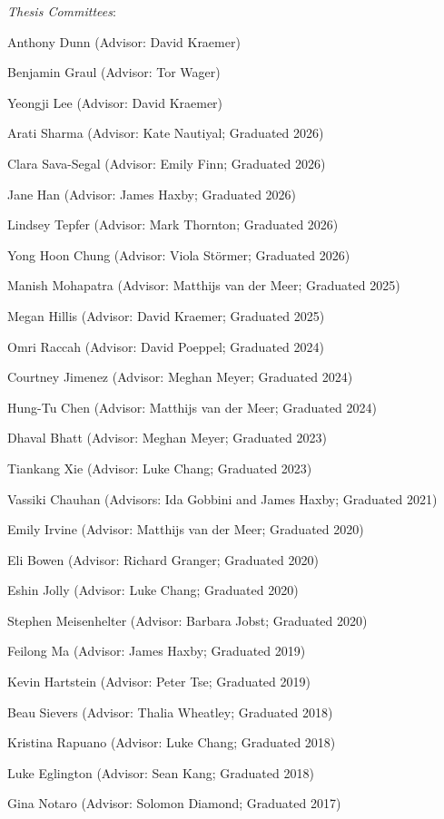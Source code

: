 \documentclass[11pt, a4paper]{article} %
\begin{document}
\textit{Thesis Committees}:
\begin{etaremune}
\item Anthony Dunn (Advisor: David Kraemer)
\item Benjamin Graul (Advisor: Tor Wager)
\item Yeongji Lee (Advisor: David Kraemer)
\item Arati Sharma (Advisor: Kate Nautiyal; Graduated 2026)
\item Clara Sava-Segal (Advisor: Emily Finn; Graduated 2026)
\item Jane Han (Advisor: James Haxby; Graduated 2026)
\item Lindsey Tepfer (Advisor: Mark Thornton; Graduated 2026)
\item Yong Hoon Chung (Advisor: Viola St\"ormer; Graduated 2026)
\item Manish Mohapatra (Advisor: Matthijs van der Meer; Graduated 2025)
\item Megan Hillis (Advisor: David Kraemer; Graduated 2025)
\item Omri Raccah (Advisor: David Poeppel; Graduated 2024)
\item Courtney Jimenez (Advisor: Meghan Meyer; Graduated 2024)
\item Hung-Tu Chen (Advisor: Matthijs van der Meer; Graduated 2024)
\item Dhaval Bhatt (Advisor: Meghan Meyer; Graduated 2023)
\item Tiankang Xie (Advisor: Luke Chang; Graduated 2023)
\item Vassiki Chauhan (Advisors: Ida Gobbini and James Haxby; Graduated 2021)
\item Emily Irvine (Advisor: Matthijs van der Meer; Graduated 2020)
\item Eli Bowen (Advisor: Richard Granger; Graduated 2020)
\item Eshin Jolly (Advisor: Luke Chang; Graduated 2020)
\item Stephen Meisenhelter (Advisor: Barbara Jobst; Graduated 2020)
\item Feilong Ma (Advisor: James Haxby; Graduated 2019)
\item Kevin Hartstein (Advisor: Peter Tse; Graduated 2019)
\item Beau Sievers (Advisor: Thalia Wheatley; Graduated 2018)
\item Kristina Rapuano (Advisor: Luke Chang; Graduated 2018)
\item Luke Eglington (Advisor: Sean Kang; Graduated 2018)
\item Gina Notaro (Advisor: Solomon Diamond; Graduated 2017)
\end{etaremune}
\end{document}
